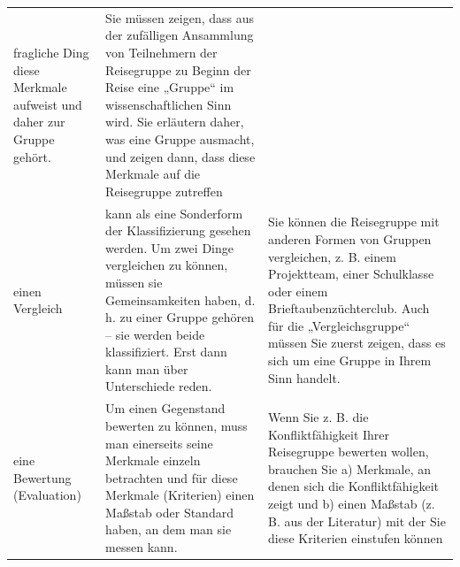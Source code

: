 \documentclass[]{book}
\theoremstyle{definition}
\theoremstyle{definition}
\theoremstyle{definition}
\theoremstyle{remark}
\begin{document}
\begin{longtable}[]{@{}lll@{}}
\begin{minipage}[t]{0.36\columnwidth}
fragliche Ding diese Merkmale aufweist und daher zur Gruppe
gehört.\strut
\end{minipage} & \begin{minipage}[t]{0.41\columnwidth}\raggedright\strut
Sie müssen zeigen, dass aus der zufälligen Ansammlung von Teilnehmern
der Reisegruppe zu Beginn der Reise eine „Gruppe`` im wissenschaftlichen
Sinn wird. Sie erläutern daher, was eine Gruppe ausmacht, und zeigen
dann, dass diese Merkmale auf die Reisegruppe zutreffen
\vspace{-6mm}\strut
\end{minipage}\tabularnewline
\begin{minipage}[t]{0.14\columnwidth}\raggedright\strut
einen Vergleich\strut
\end{minipage} & \begin{minipage}[t]{0.36\columnwidth}\raggedright\strut
kann als eine Sonderform der Klassifizierung gesehen werden. Um zwei
Dinge vergleichen zu können, müssen sie Gemeinsamkeiten haben, d. h. zu
einer Gruppe gehören -- sie werden beide klassifiziert. Erst dann kann
man über Unterschiede reden.\strut
\end{minipage} & \begin{minipage}[t]{0.41\columnwidth}\raggedright\strut
Sie können die Reisegruppe mit anderen Formen von Gruppen vergleichen,
z. B. einem Projektteam, einer Schulklasse oder einem
Brieftaubenzüchterclub. Auch für die „Vergleichsgruppe`` müssen Sie
zuerst zeigen, dass es sich um eine Gruppe in Ihrem Sinn handelt.
\vspace{-6mm}\strut
\end{minipage}\tabularnewline
\begin{minipage}[t]{0.14\columnwidth}\raggedright\strut
eine Bewertung (Evaluation)\strut
\end{minipage} & \begin{minipage}[t]{0.36\columnwidth}\raggedright\strut
Um einen Gegenstand bewerten zu können, muss man einerseits seine
Merkmale einzeln betrachten und für diese Merkmale (Kriterien) einen
Maßstab oder Standard haben, an dem man sie messen kann.\strut
\end{minipage} & \begin{minipage}[t]{0.41\columnwidth}\raggedright\strut
Wenn Sie z. B. die Konfliktfähigkeit Ihrer Reisegruppe bewerten wollen,
brauchen Sie a) Merkmale, an denen sich die Konfliktfähigkeit zeigt und
b) einen Maßstab (z. B. aus der Literatur) mit der Sie diese Kriterien
einstufen können \vspace{-6mm}\strut

\end{minipage}
\end{longtable}
\end{document}
